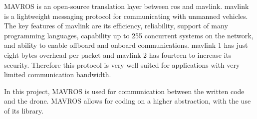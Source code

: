 MAVROS is an open\hyp{}source translation layer between \acs{ros} and \acs{mavlink}. \acs{mavlink} is a lightweight messaging protocol for communicating with unmanned vehicles. The key features of \acs{mavlink} are its efficiency, reliability, support of many programming languages, capability up to 255 concurrent systems on the network, and ability to enable offboard and onboard communications. \acs{mavlink} 1 has just eight bytes overhead per packet and \acs{mavlink} 2 has fourteen to increase its security. Therefore this protocol is very well suited for applications with very limited communication bandwidth. \cite{mavlink_developer_guide}

In this project, MAVROS is used for communication between the written code and the drone. MAVROS allows for coding on a higher abstraction, with the use of its library.